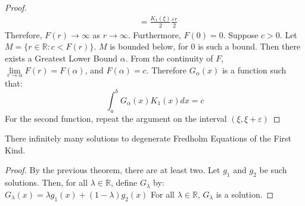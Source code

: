 \documentclass[crop=false,class=book,oneside]{standalone}
\begin{document}
\begin{proof}
\begin{subequations}
\begin{align}
                        &=\frac{K_{1}(\xi)}{2}\frac{\varepsilon r}{2}
                    \end{align}
                \end{subequations}
                Therefore, $F(r)\rightarrow \infty$ as
                $r\rightarrow\infty$. Furthermore, $F(0) = 0$.
                Suppose $c>0$. Let $M=\{r\in\mathbb{R}:c<F(r)\}$.
                $M$ is bounded below, for $0$ is such a bound. Then
                there exists a Greatest Lower Bound $\alpha$. From
                the continuity of $F$,
                $\underset{r\rightarrow\alpha}{\lim}F(r)=F(\alpha)$,
                and $F(\alpha)=c$. Therefore $G_{\alpha}(x)$ is a
                function such that:
                \begin{equation*}
                    \int_{a}^{b}G_{\alpha}(x)K_{1}(x)dx=c
                \end{equation*}
                For the second function, repeat the argument on the
                interval $(\xi,\xi+\varepsilon)$
            \end{proof}
            \begin{theorem}
                There infinitely many solutions to degenerate
                Fredholm Equations of the First Kind.
            \end{theorem}
            \begin{proof}
                By the previous theorem, there are at least two. Let
                $g_{1}$ and $g_{2}$ be such solutions. Then, for all
                $\lambda\in\mathbb{R}$, define $G_{\lambda}$ by:
                $G_{\lambda}(x)=\lambda g_{1}(x)+(1-\lambda)g_{2}(x)$
                For all $\lambda\in\mathbb{R}$, $G_{\lambda}$ is a
                solution.
            \end{proof}
\end{document}
